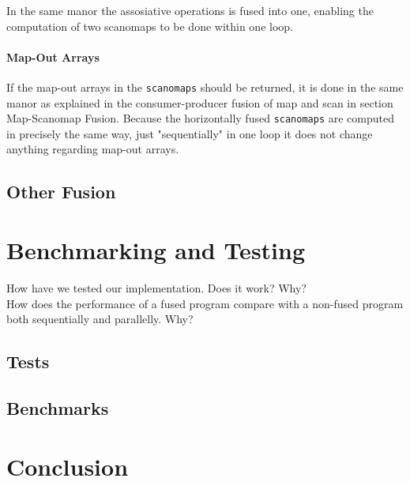 \documentclass[11pt]{article}
\begin{document}
In the same manor the assosiative operations is fused into one, enabling the computation of two scanomaps to be done within one loop. 

\paragraph{Map-Out Arrays}
If the map-out arrays in the \texttt{scanomaps} should be returned, it is done in the same manor as explained in the consumer-producer fusion of map and scan in section Map-Scanomap Fusion. Because the horizontally fused \texttt{scanomaps} are computed in precisely the same way, just "sequentially" in one loop it does not change anything regarding map-out arrays.

\subsection{Other Fusion}





\section{Benchmarking and Testing}
How have we tested our implementation. Does it work? Why?\\
How does the performance of a fused program compare with a non-fused program both sequentially and parallelly. Why?

\subsection{Tests}

\subsection{Benchmarks}

\section{Conclusion}
\newpage



\end{document}
